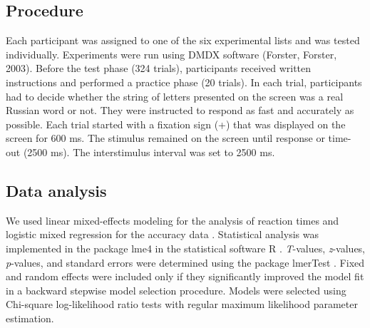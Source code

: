 \documentclass[output=paper, modfonts,newtxmath,hidelinks]{langscibook}
\begin{document}
\subsection{Procedure} Each participant was assigned to one of the six experimental lists and was tested individually. Experiments were run using DMDX software (Forster, Forster, 2003). Before the test phase (324 trials), participants received written instructions and performed a practice phase (20 trials). In each trial, participants had to decide whether the string of letters presented on the screen was a real Russian word or not. They were instructed to respond as fast and accurately as possible. Each trial started with a fixation sign (+) that was displayed on the screen for 600 ms. The stimulus remained on the screen until response or time-out (2500 ms). The interstimulus interval was set to 2500 ms.

\subsection{Data analysis} We used linear mixed-effects modeling for the analysis of reaction times and logistic mixed regression for the accuracy data  \citep{baayen2008analyzing}. Statistical analysis was implemented in the package lme4  \citep{bates2014lme4} in the statistical software R \citep{team2014r}. \textit{T}-values, \textit{z}-values, \textit{p}-values, and standard errors were determined using the package lmerTest \citep{kuznetsova2015package}. Fixed and random effects were included only if they significantly improved the model fit in a backward stepwise model selection procedure. Models were selected using Chi-square log-likelihood ratio tests with regular maximum likelihood parameter estimation. 
\end{document}
